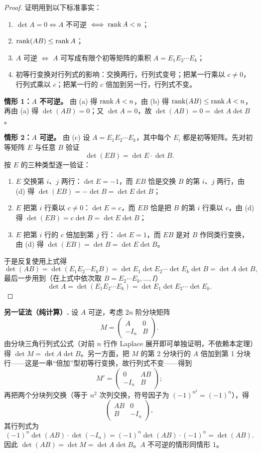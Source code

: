 \begin{proof}
证明用到以下标准事实：
\begin{enumerate}[label=(\alph*)]
  \item \(\det A=0\iff A\) 不可逆 \(\iff\operatorname{rank} A<n\)；
  \item \(\operatorname{rank}(AB)\le\operatorname{rank} A\)；
  \item \(A\) 可逆 \(\iff\) \(A\) 可写成有限个初等矩阵的乘积 \(A=E_1E_2\cdots E_k\)；
  \item 初等行变换对行列式的影响：交换两行，行列式变号；把某一行乘以 \(c\ne0\)，行列式乘以 \(c\)；把某一行的 \(c\) 倍加到另一行，行列式不变。
\end{enumerate}

\textbf{情形 1：\(A\) 不可逆。} 由 (a) 得 \(\operatorname{rank} A<n\)，由 (b) 得 \(\operatorname{rank}(AB)\le\operatorname{rank} A<n\)，再由 (a) 得 \(\det(AB)=0\)；又 \(\det A=0\)，故 \(\det(AB)=0=\det A\det B\)。

\textbf{情形 2：\(A\) 可逆。} 由 (c) 设 \(A=E_1E_2\cdots E_k\)，其中每个 \(E_i\) 都是初等矩阵。先对初等矩阵 \(E\) 与任意 \(B\) 验证
\[
\det(EB)=\det E\cdot\det B .
\]
按 \(E\) 的三种类型逐一验证：
\begin{enumerate}[label=(\arabic*)]
  \item \(E\) 交换第 \(i\)、\(j\) 两行：\(\det E=-1\)，而 \(EB\) 恰是交换 \(B\) 的第 \(i\)、\(j\) 两行，由 (d) 得 \(\det(EB)=-\det B=\det E\det B\)；
  \item \(E\) 把第 \(i\) 行乘以 \(c\ne0\)：\(\det E=c\)，而 \(EB\) 恰是把 \(B\) 的第 \(i\) 行乘以 \(c\)，由 (d) 得 \(\det(EB)=c\det B=\det E\det B\)；
  \item \(E\) 把第 \(i\) 行的 \(c\) 倍加到第 \(j\) 行：\(\det E=1\)，而 \(EB\) 是对 \(B\) 作同类行变换，由 (d) 得 \(\det(EB)=\det B=\det E\det B\)。
\end{enumerate}
于是反复使用上式得
\[
\det(AB)=\det(E_1E_2\cdots E_kB)
=\det E_1\det E_2\cdots\det E_k\det B
=\det A\det B,
\]
最后一步用到（在上式中依次取 \(B=E_2\cdots E_k,\dots,I\)）
\[
\det A=\det(E_1E_2\cdots E_k)=\det E_1\det E_2\cdots\det E_k .
\]
\end{proof}

\noindent\textbf{另一证法（纯计算）.} 设 \(A\) 可逆，考虑 \(2n\) 阶分块矩阵
\[
M=\begin{pmatrix}A&0\\-I_n&B\end{pmatrix}.
\]
由分块三角行列式公式（对前 \(n\) 行作 Laplace 展开即可单独证明，不依赖本定理）得 \(\det M=\det A\det B\)。另一方面，把 \(M\) 的第 2 分块行的 \(A\) 倍加到第 1 分块行——这是一串“倍加”型初等行变换，故行列式不变——得到
\[
M'=\begin{pmatrix}0&AB\\-I_n&B\end{pmatrix};
\]
再把两个分块列交换（等于 \(n^2\) 次列交换，符号因子为 \((-1)^{n^2}=(-1)^n\)），得
\[
\begin{pmatrix}AB&0\\B&-I_n\end{pmatrix},
\]
其行列式为
\[
(-1)^n\det(AB)\cdot\det(-I_n)=(-1)^n\det(AB)\cdot(-1)^n=\det(AB).
\]
因此 \(\det(AB)=\det M=\det A\det B\)。\(A\) 不可逆的情形同情形 1。

